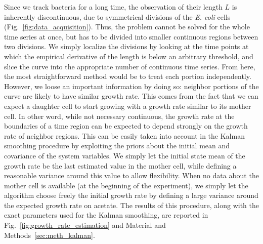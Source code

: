 Since we track bacteria for a long time, the observation of their length $L$ is inherently discontinuous, due to symmetrical divisions of the \textit{E. coli} cells (Fig.~\ref{fig:data_acquisition}).
Thus, the problem cannot be solved for the whole time series at once, but has to be divided into smaller continuous regions between two divisions.
We simply localize the divisions by looking at the time points at which the empirical derivative of the length is below an arbitrary threshold, and slice the curve into the appropriate number of continuous time series.
From here, the most straightforward method would be to treat each portion independently.
However, we loose an important information by doing so: neighbor portions of the curve are likely to have similar growth rate.
This comes from the fact that we can expect a daughter cell to start growing with a growth rate similar to its mother cell.
In other word, while not necessary continuous, the growth rate at the boundaries of a time region can be expected to depend strongly on the growth rate of neighbor regions.
This can be easily taken into account in the Kalman smoothing procedure by exploiting the priors about the initial mean and covariance of the system variables.
We simply let the initial state mean of the growth rate be the last estimated value in the mother cell, while defining a reasonable variance around this value to allow flexibility.
When no data about the mother cell is available (at the beginning of the experiment), we simply let the algorithm choose freely the initial growth rate by defining a large variance around the expected growth rate on acetate.
The results of this procedure, along with the exact parameters used for the Kalman smoothing, are reported in Fig.~\ref{fig:growth_rate_estimation} and Material and Methods~\ref{sec:meth_kalman}.

